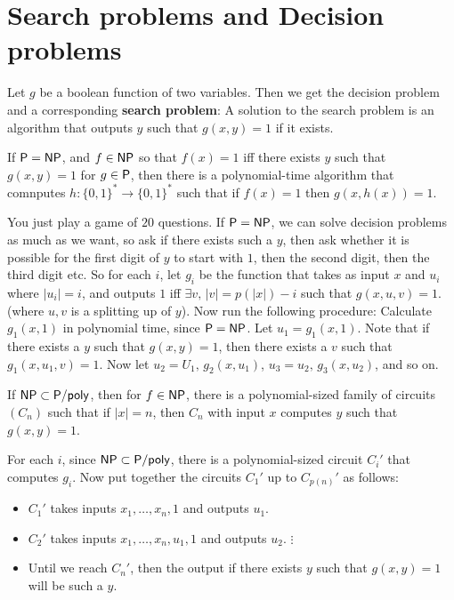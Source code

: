 \documentclass{article}
\begin{document}
\section{Search problems and Decision problems}
Let $g$ be a boolean function of two variables. Then we get the decision problem  and a corresponding \textbf{search problem}:  A solution to the search problem is an algorithm that outputs $y$ such that $g(x,y)=1$ if it exists.
\begin{fancyprop}{}
    If $\mathsf{P} = \mathsf{NP}$, and $f \in \mathsf{NP}$ so that $f(x)=1$ iff there exists $y$ such that $g(x,y)=1$ for $g \in \mathsf{P}$, then there is a polynomial-time algorithm that comnputes $h : \{0,1\}^{*} \to \{0,1\}^{*}$ such that if $f(x)=1$ then $g(x,h(x))=1$.
\end{fancyprop}
\proof You just play a game of $20$ questions. If $\mathsf{P} = \mathsf{NP}$, we can solve decision problems as much as we want, so ask if there exists such a $y$, then ask whether it is possible for the first digit of $y$ to start with $1$, then the second digit, then the third digit etc. \gap So for each $i$, let $g_{i}$ be the function that takes as input $x$ and $u_{i}$ where $|u_{i}|=i$, and outputs $1$ iff $\exists v, \, |v|=p(|x|)-i$ such that $g(x,u,v)=1$. (where $u,v$ is a splitting up of $y$). Now run the following procedure: Calculate $g_{1}(x,1)$ in polynomial time, since $\mathsf{P} = \mathsf{NP}$. Let $u_{1}=g_{1}(x,1)$. Note that if there exists a $y$ such that $g(x,y)=1$, then there exists a $v$ such that $g_{1}(x,u_{1},v)=1$. Now let $u_{2}=U_{1}, \, g_{2}(x,u_{1})$, $u_{3}=u_{2}, \, g_{3}(x,u_{2})$, and so on. \endproof
\begin{fancylem}{}
    If $\mathsf{NP} \subset \mathsf{P/poly}$, then for $f \in \mathsf{NP}$, there is a polynomial-sized family of circuits $(C_{n})$ such that if $|x|=n$, then $C_{n}$ with input $x$ computes $y$ such that $g(x,y)=1$.
\end{fancylem}
\proof For each $i$, since $\mathsf{NP} \subset \mathsf{P/poly}$, there is a polynomial-sized circuit $C_{i}'$ that computes $g_{i}$. Now put together the circuits $C_{1}'$ up to $C_{p(n)}'$ as follows: \begin{itemize}
    \item $C_{1}'$ takes inputs $x_{1},\dots, x_{n},1$ and outputs $u_{1}$.
    \item $C_{2}'$ takes inputs $x_{1},\dots,x_{n},u_{1},1$ and outputs $u_{2}$.
    $\vdots$
    \item Until we reach $C_{n}'$, then the output if there exists $y$ such that $g(x,y)=1$ will be such a $y$.
\end{itemize}
\end{document}
